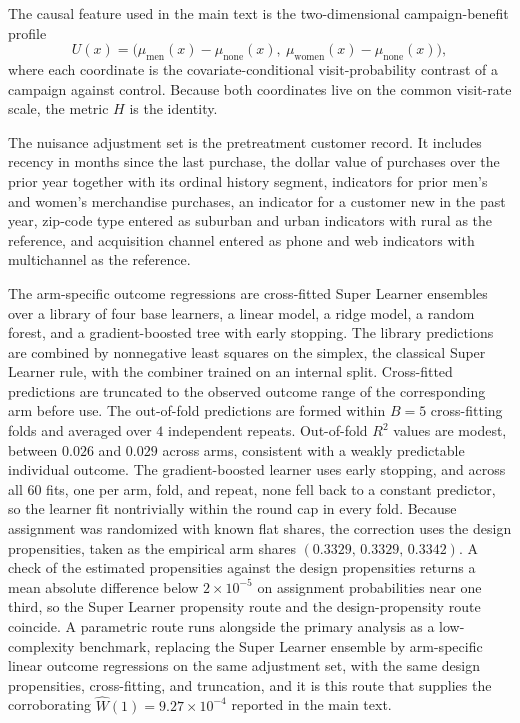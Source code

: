 \documentclass[11pt]{article}
\begin{document}
The causal feature used in the main text is the two-dimensional campaign-benefit profile
\[
U(x)=\bigl(\mu_{\mathrm{men}}(x)-\mu_{\mathrm{none}}(x),\ \mu_{\mathrm{women}}(x)-\mu_{\mathrm{none}}(x)\bigr),
\]
where each coordinate is the covariate-conditional visit-probability contrast of a campaign against control. Because both coordinates live on the common visit-rate scale, the metric $H$ is the identity.

The nuisance adjustment set is the pretreatment customer record. It includes recency in months since the last purchase, the dollar value of purchases over the prior year together with its ordinal history segment, indicators for prior men's and women's merchandise purchases, an indicator for a customer new in the past year, zip-code type entered as suburban and urban indicators with rural as the reference, and acquisition channel entered as phone and web indicators with multichannel as the reference.

The arm-specific outcome regressions are cross-fitted Super Learner ensembles over a library of four base learners, a linear model, a ridge model, a random forest, and a gradient-boosted tree with early stopping. The library predictions are combined by nonnegative least squares on the simplex, the classical Super Learner rule, with the combiner trained on an internal split. Cross-fitted predictions are truncated to the observed outcome range of the corresponding arm before use. The out-of-fold predictions are formed within $B=5$ cross-fitting folds and averaged over $4$ independent repeats. Out-of-fold $R^2$ values are modest, between $0.026$ and $0.029$ across arms, consistent with a weakly predictable individual outcome. The gradient-boosted learner uses early stopping, and across all $60$ fits, one per arm, fold, and repeat, none fell back to a constant predictor, so the learner fit nontrivially within the round cap in every fold. Because assignment was randomized with known flat shares, the correction uses the design propensities, taken as the empirical arm shares $(0.3329,\,0.3329,\,0.3342)$. A check of the estimated propensities against the design propensities returns a mean absolute difference below $2\times10^{-5}$ on assignment probabilities near one third, so the Super Learner propensity route and the design-propensity route coincide. A parametric route runs alongside the primary analysis as a low-complexity benchmark, replacing the Super Learner ensemble by arm-specific linear outcome regressions on the same adjustment set, with the same design propensities, cross-fitting, and truncation, and it is this route that supplies the corroborating $\widehat W(1)=9.27\times10^{-4}$ reported in the main text.
\end{document}
